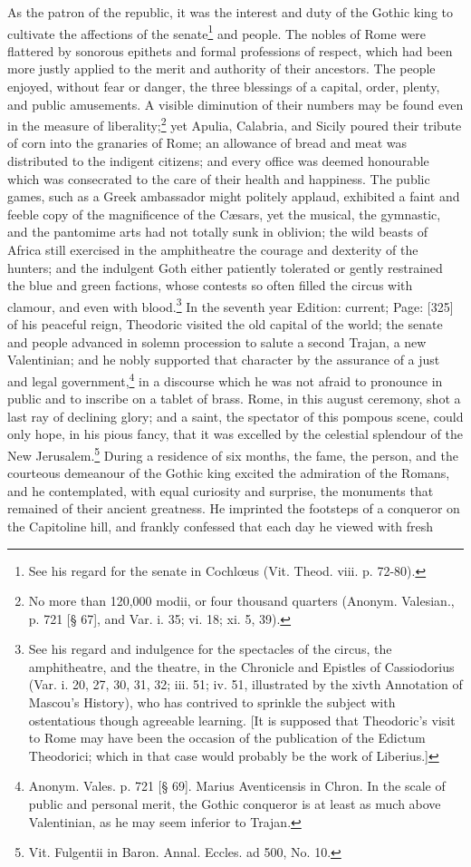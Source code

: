 As the patron of the republic, it was the interest and duty of the Gothic king to cultivate the affections of the senate\footnote{See his regard for the senate in Cochlœus (Vit. Theod. viii. p. 72-80).} and people. The nobles of Rome were flattered by sonorous epithets and formal professions of respect, which had been more justly applied to the merit and authority of their ancestors. The people enjoyed, without fear or danger, the three blessings of a capital, order, plenty, and public amusements. A visible diminution of their numbers may be found even in the measure of liberality;\footnote{No more than 120,000 modii, or four thousand quarters (Anonym. Valesian., p. 721 [§ 67], and Var. i. 35; vi. 18; xi. 5, 39).} yet Apulia, Calabria, and Sicily poured their tribute of corn into the granaries of Rome; an allowance of bread and meat was distributed to the indigent citizens; and every office was deemed honourable which was consecrated to the care of their health and happiness. The public games, such as a Greek ambassador might politely applaud, exhibited a faint and feeble copy of the magnificence of the Cæsars, yet the musical, the gymnastic, and the pantomime arts had not totally sunk in oblivion; the wild beasts of Africa still exercised in the amphitheatre the courage and dexterity of the hunters; and the indulgent Goth either patiently tolerated or gently restrained the blue and green factions, whose contests so often filled the circus with clamour, and even with blood.\footnote{See his regard and indulgence for the spectacles of the circus, the amphitheatre, and the theatre, in the Chronicle and Epistles of Cassiodorius (Var. i. 20, 27, 30, 31, 32; iii. 51; iv. 51, illustrated by the xivth Annotation of Mascou\texthebrew{}’s History), who has contrived to sprinkle the subject with ostentatious though agreeable learning. [It is supposed that Theodoric\texthebrew{}’s visit to Rome may have been the occasion of the publication of the Edictum Theodorici; which in that case would probably be the work of Liberius.]} In the seventh year Edition: current; Page: [325] of his peaceful reign, Theodoric visited the old capital of the world; the senate and people advanced in solemn procession to salute a second Trajan, a new Valentinian; and he nobly supported that character by the assurance of a just and legal government,\footnote{Anonym. Vales. p. 721 [§ 69]. Marius Aventicensis in Chron. In the scale of public and personal merit, the Gothic conqueror is at least as much above Valentinian, as he may seem inferior to Trajan.} in a discourse which he was not afraid to pronounce in public and to inscribe on a tablet of brass. Rome, in this august ceremony, shot a last ray of declining glory; and a saint, the spectator of this pompous scene, could only hope, in his pious fancy, that it was excelled by the celestial splendour of the New Jerusalem.\footnote{Vit. Fulgentii in Baron. Annal. Eccles. ad 500, No. 10.} During a residence of six months, the fame, the person, and the courteous demeanour of the Gothic king excited the admiration of the Romans, and he contemplated, with equal curiosity and surprise, the monuments that remained of their ancient greatness. He imprinted the footsteps of a conqueror on the Capitoline hill, and frankly confessed that each day he viewed with fresh 